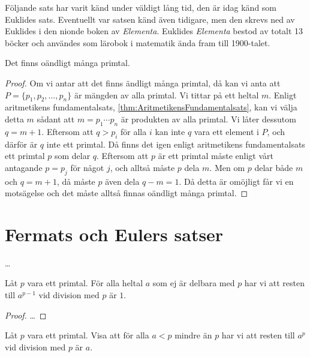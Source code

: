 Följande sats har varit känd under väldigt lång tid, den är idag känd som
Euklides sats.
Eventuellt var satsen känd även tidigare, men den skrevs ned av Euklides i
den nionde boken av \emph{Elementa}.
Euklides \emph{Elementa} bestod av totalt 13 böcker och användes som lärobok
i matematik ända fram till 1900-talet.
\begin{theorem}
  Det finns oändligt många primtal.
\end{theorem}
\begin{proof}
  Om vi antar att det finns ändligt många primtal, då kan vi anta att \(P 
  = \{p_1, p_2, \ldots, p_n\}\) är mängden av alla primtal.
  Vi tittar på ett heltal \(m\).
  Enligt aritmetikens fundamentalsats, 
  \cref{thm:AritmetikensFundamentalsats}, kan vi välja detta \(m\) sådant 
  att \(m = p_1\cdots p_n\) är produkten av alla primtal.
  Vi låter dessutom \(q=m+1\).
  Eftersom att \(q > p_i\) för alla \(i\) kan inte \(q\) vara ett element i
  \(P\), och därför är \(q\) inte ett primtal.
  Då finns det igen enligt aritmetikens fundamentalsats ett primtal \(p\) som 
  delar \(q\).
  Eftersom att \(p\) är ett primtal måste enligt vårt antagande \(p = p_j\) för 
  något \(j\), och alltså måste \(p\) dela \(m\).
  Men om \(p\) delar både \(m\) och \(q = m + 1\), då måste \(p\) även dela
  \(q - m = 1\).
  Då detta är omöjligt får vi en motsägelse och det måste alltså finnas
  oändligt många primtal.
\end{proof}


\section{Fermats och Eulers satser}\label{sec:fermateuler}
\dots

\begin{theorem}
  Låt \(p\) vara ett primtal.
  För alla heltal \(a\) som ej är delbara med \(p\) har vi att resten till 
  \(a^{p-1}\) vid division med \(p\) är \(1\).
\end{theorem}
\begin{proof}
  \dots
\end{proof}

\begin{exercise}
  Låt \(p\) vara ett primtal.
  Visa att för alla \(a < p\) mindre än \(p\) har vi att resten till \(a^p\) 
  vid division med \(p\) är \(a\).
\end{exercise}

